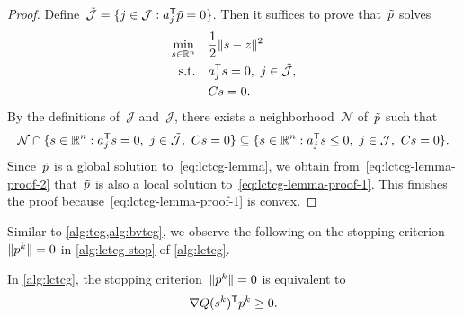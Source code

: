 \begin{proof}
    Define~$\tilde{\mathcal{J}} = \set{j \in \mathcal{J} : a_j^{\T} \tilde{\pstep} = 0}$.
    Then it suffices to prove that~$\tilde{\pstep}$ solves
    \begin{subequations}
        \label{eq:lctcg-lemma-proof-1}
        \begin{align}
            \min_{\sstep \in \R^n}  & \quad \frac{1}{2} \norm{\sstep - z}^2\\
            \text{s.t.}             & \quad a_j^{\T} \sstep = 0, ~ j \in \tilde{\mathcal{J}},\\
                                    & \quad C \sstep = 0.
        \end{align}
    \end{subequations}
    By the definitions of~$\mathcal{J}$ and~$\tilde{\mathcal{J}}$, there exists a neighborhood~$\mathcal{N}$ of~$\tilde{\pstep}$ such that
    \begin{equation}
        \label{eq:lctcg-lemma-proof-2}
        \mathcal{N} \cap \set{\sstep \in \R^n : a_j^{\T} \sstep = 0, ~ j \in \tilde{\mathcal{J}}, ~ C \sstep = 0} \subseteq \set{\sstep \in \R^n : a_j^{\T} \sstep \le 0, ~ j \in \mathcal{J}, ~ C \sstep = 0}.
    \end{equation}
    Since~$\tilde{\pstep}$ is a global solution to~\cref{eq:lctcg-lemma}, we obtain from~\cref{eq:lctcg-lemma-proof-2} that~$\tilde{\pstep}$ is also a local solution to~\cref{eq:lctcg-lemma-proof-1}.
    This finishes the proof because~\cref{eq:lctcg-lemma-proof-1} is convex.
\end{proof}

Similar to \cref{alg:tcg,alg:bvtcg}, we observe the following on the stopping criterion~$\norm{\pstep[k]} = 0$ in \cref{alg:lctcg-stop} of \cref{alg:lctcg}.

\begin{proposition}
    In \cref{alg:lctcg}, the stopping criterion~$\norm{\pstep[k]} = 0$ is equivalent to
    \begin{equation}
        \label{eq:lctcg-prop-stopping}
        \nabla Q (\sstep[k])^{\T} \pstep[k] \ge 0.
    \end{equation}
\end{proposition}

